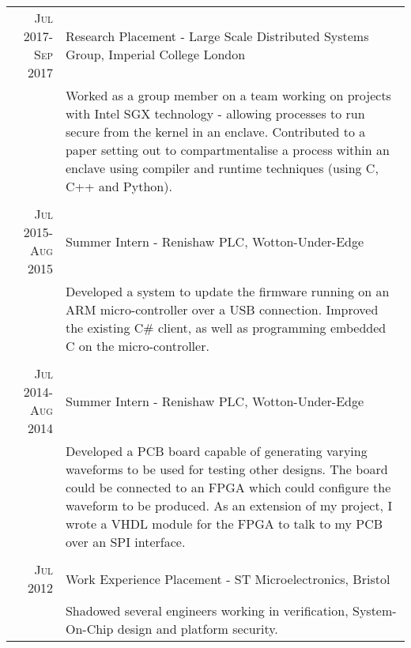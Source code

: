 \documentclass[a4paper,10pt]{article} %
\begin{document}
\begin{tabular}{r|p{14cm}}
\textsc{Jul 2017-Sep 2017} & Research Placement - Large Scale Distributed Systems Group, Imperial College London  \emph{}\\
& \footnotesize{Worked as a group member on a team working on projects with Intel SGX technology - allowing processes to run secure from the kernel in an enclave. Contributed to a paper setting out to compartmentalise a process within an enclave using compiler and runtime techniques (using C, C++ and Python).}\\
\multicolumn{2}{c}{} \\

\textsc{Jul 2015-Aug 2015} & Summer Intern - Renishaw PLC, Wotton-Under-Edge \emph{}\\ 
& \footnotesize{Developed a system to update the firmware running on an ARM micro-controller over a USB connection. Improved the existing C\# client, as well as programming embedded C on the micro-controller.}\\
\multicolumn{2}{c}{} \\


\textsc{Jul 2014-Aug 2014} & Summer Intern - Renishaw PLC, Wotton-Under-Edge \emph{}\\
& \footnotesize{Developed a PCB board capable of generating varying waveforms to be used for testing other designs. The board could be connected to an FPGA which could configure the waveform to be produced. As an extension of my project, I wrote a VHDL module for the FPGA to talk to my PCB over an SPI interface.}\\
\multicolumn{2}{c}{} \\


\textsc{Jul 2012} & Work Experience Placement - ST Microelectronics, Bristol \emph{}\\
& \footnotesize{Shadowed several engineers working in verification, System-On-Chip design and platform security.}
\end{tabular}

\end{document}
